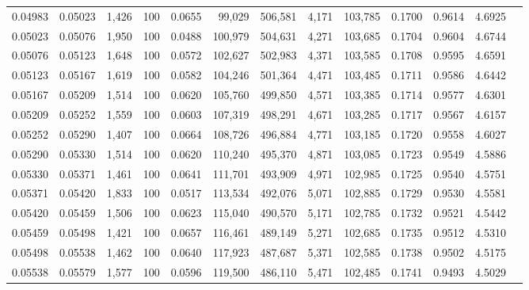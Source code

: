 \begin{tabular}{rrrrrrrrrrrrr}
0.04983 & 0.05023 & 1,426 & 100 &                                     0.0655 &  99,029 & 506,581 &   4,171 & 103,785 & 0.1700 & 0.9614 & 4.6925 \\
0.05023 & 0.05076 & 1,950 & 100 &                                     0.0488 & 100,979 & 504,631 &   4,271 & 103,685 & 0.1704 & 0.9604 & 4.6744 \\
0.05076 & 0.05123 & 1,648 & 100 &                                     0.0572 & 102,627 & 502,983 &   4,371 & 103,585 & 0.1708 & 0.9595 & 4.6591 \\
0.05123 & 0.05167 & 1,619 & 100 &                                     0.0582 & 104,246 & 501,364 &   4,471 & 103,485 & 0.1711 & 0.9586 & 4.6442 \\
0.05167 & 0.05209 & 1,514 & 100 &                                     0.0620 & 105,760 & 499,850 &   4,571 & 103,385 & 0.1714 & 0.9577 & 4.6301 \\
0.05209 & 0.05252 & 1,559 & 100 &                                     0.0603 & 107,319 & 498,291 &   4,671 & 103,285 & 0.1717 & 0.9567 & 4.6157 \\
0.05252 & 0.05290 & 1,407 & 100 &                                     0.0664 & 108,726 & 496,884 &   4,771 & 103,185 & 0.1720 & 0.9558 & 4.6027 \\
0.05290 & 0.05330 & 1,514 & 100 &                                     0.0620 & 110,240 & 495,370 &   4,871 & 103,085 & 0.1723 & 0.9549 & 4.5886 \\
0.05330 & 0.05371 & 1,461 & 100 &                                     0.0641 & 111,701 & 493,909 &   4,971 & 102,985 & 0.1725 & 0.9540 & 4.5751 \\
0.05371 & 0.05420 & 1,833 & 100 &                                     0.0517 & 113,534 & 492,076 &   5,071 & 102,885 & 0.1729 & 0.9530 & 4.5581 \\
0.05420 & 0.05459 & 1,506 & 100 &                                     0.0623 & 115,040 & 490,570 &   5,171 & 102,785 & 0.1732 & 0.9521 & 4.5442 \\
0.05459 & 0.05498 & 1,421 & 100 &                                     0.0657 & 116,461 & 489,149 &   5,271 & 102,685 & 0.1735 & 0.9512 & 4.5310 \\
0.05498 & 0.05538 & 1,462 & 100 &                                     0.0640 & 117,923 & 487,687 &   5,371 & 102,585 & 0.1738 & 0.9502 & 4.5175 \\
0.05538 & 0.05579 & 1,577 & 100 &                                     0.0596 & 119,500 & 486,110 &   5,471 & 102,485 & 0.1741 & 0.9493 & 4.5029 \\

\end{tabular}
